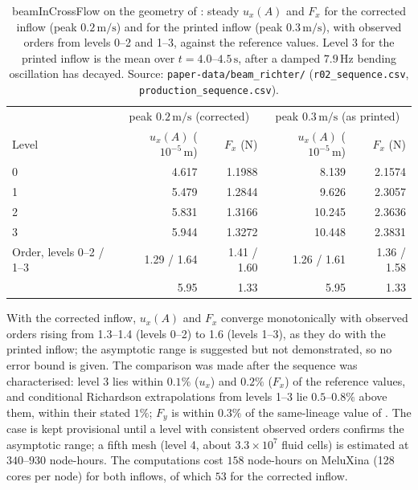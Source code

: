 \documentclass[sn-mathphys,Numbered]{sn-jnl}%
\begin{document}
\begin{appendices}
\begin{table}[htbp]
	\centering
	\footnotesize
	\caption{beamInCrossFlow on the geometry of \citet{Richter2012}: steady $u_x(A)$ and $F_x$ for the corrected inflow (peak $0.2\,\mathrm{m/s}$) and for the printed inflow (peak $0.3\,\mathrm{m/s}$), with observed orders from levels 0--2 and 1--3, against the reference values. Level 3 for the printed inflow is the mean over $t = 4.0$--$4.5\,\mathrm{s}$, after a damped $7.9\,\mathrm{Hz}$ bending oscillation has decayed. Source: \texttt{paper-data/beam\_richter/} (\texttt{r02\_sequence.csv}, \texttt{production\_sequence.csv}).}
	\label{tab:beam_seq}
	\begin{tabular}{lrrrr}
		\toprule
		& \multicolumn{2}{c}{peak $0.2\,\mathrm{m/s}$ (corrected)} & \multicolumn{2}{c}{peak $0.3\,\mathrm{m/s}$ (as printed)} \\
		Level & $u_x(A)$ ($10^{-5}\,\mathrm{m}$) & $F_x$ (N) & $u_x(A)$ ($10^{-5}\,\mathrm{m}$) & $F_x$ (N) \\
		\midrule
		0 & 4.617 & 1.1988 & 8.139 & 2.1574 \\
		1 & 5.479 & 1.2844 & 9.626 & 2.3057 \\
		2 & 5.831 & 1.3166 & 10.245 & 2.3636 \\
		3 & 5.944 & 1.3272 & 10.448 & 2.3831 \\
		\midrule
		Order, levels 0--2 / 1--3 & 1.29 / 1.64 & 1.41 / 1.60 & 1.26 / 1.61 & 1.36 / 1.58 \\
		\citet{Richter2012} & 5.95 & 1.33 & 5.95 & 1.33 \\
		\bottomrule
	\end{tabular}
\end{table}

With the corrected inflow, $u_x(A)$ and $F_x$ converge monotonically with observed orders rising from 1.3--1.4 (levels 0--2) to 1.6 (levels 1--3), as they do with the printed inflow; the asymptotic range is suggested but not demonstrated, so no error bound is given.
The comparison was made after the sequence was characterised: level 3 lies within $0.1\%$ ($u_x$) and $0.2\%$ ($F_x$) of the reference values, and conditional Richardson extrapolations from levels 1--3 lie $0.5$--$0.8\%$ above them, within their stated $1\%$; $F_y$ is within $0.3\%$ of the same-lineage value of \citet{Tukovic2018}.
The case is kept provisional until a level with consistent observed orders confirms the asymptotic range; a fifth mesh (level 4, about $3.3\times10^{7}$ fluid cells) is estimated at $340$--$930$ node-hours.
The computations cost $158$ node-hours on MeluXina (128 cores per node) for both inflows, of which $53$ for the corrected inflow.






\end{appendices}
\end{document}
